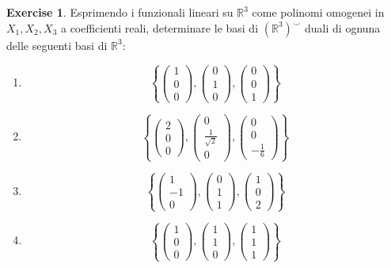 \documentclass{article}
\theoremstyle{plain}
\theoremstyle{definition}
\newtheorem{xca}[exmp]{Exercise}
\theoremstyle{remark}
\begin{document}
\vspace{10pt}

\begin{bxthm}
\begin{xca}
    Esprimendo i funzionali lineari su $\mathbb{R}^3$ come polinomi omogenei in $X_1,X_2,X_3$ a coefficienti reali, determinare le basi di $(\mathbb{R}^3)^\smile$ duali di ognuna delle seguenti basi di $\mathbb{R}^3$:
    \begin{multicols}{2}
        \begin{enumerate}
            \item \[\left\{\begin{pmatrix}1\\0\\0\end{pmatrix},\begin{pmatrix}0\\1\\0\end{pmatrix},\begin{pmatrix}0\\0\\1\end{pmatrix}\right\}\]
            \item \[\left\{\begin{pmatrix}2\\0\\0\end{pmatrix},\begin{pmatrix}0\\\frac{1}{\sqrt{2}}\\0\end{pmatrix},\begin{pmatrix}0\\0\\-\frac{1}{6}\end{pmatrix}\right\}\]
            \item \[\left\{\begin{pmatrix}1\\-1\\0\end{pmatrix},\begin{pmatrix}0\\1\\1\end{pmatrix},\begin{pmatrix}1\\0\\2\end{pmatrix}\right\}\]
            \item \[\left\{\begin{pmatrix}1\\0\\0\end{pmatrix},\begin{pmatrix}1\\1\\0\end{pmatrix},\begin{pmatrix}1\\1\\1\end{pmatrix}\right\}\]

\end{enumerate}
\end{multicols}
\end{xca}
\end{bxthm}
\end{document}
